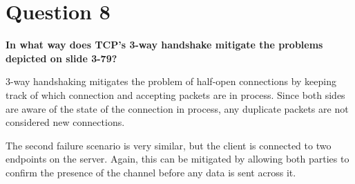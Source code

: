\documentclass[12pt]{article}
\begin{document}
\section*{Question 8}

\textbf{In what way does TCP's 3-way handshake mitigate the problems depicted on slide 3-79?}

3-way handshaking mitigates the problem of half-open connections by keeping track of which connection and accepting packets are in process. Since both sides are aware of the state of the connection in process, any duplicate packets are not considered new connections.

The second failure scenario is very similar, but the client is connected to two endpoints on the server. Again, this can be mitigated by allowing both parties to confirm the presence of the channel before any data is sent across it.
\end{document}
